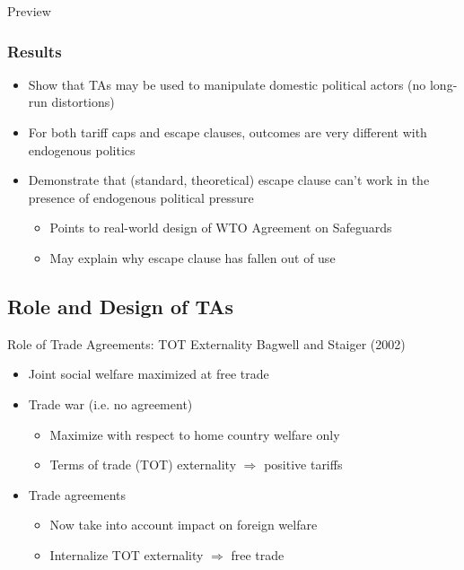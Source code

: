 \documentclass[handout]{beamer}
\begin{document}
\begin{frame}{Preview}
\frametitle{Results}

\pause
\begin{itemize}[<+->]
	\item Show that TAs may be used to manipulate domestic political actors (no long-run distortions)
	\item For both tariff caps and escape clauses, outcomes are very different with endogenous politics
	\item Demonstrate that (standard, theoretical) escape clause can't work in the presence of endogenous political pressure
		\begin{itemize}
			\item Points to real-world design of WTO Agreement on Safeguards
			\item May explain why escape clause has fallen out of use
		\end{itemize}
\end{itemize}
\end{frame}

\begin{comment}
\begin{frame}{Outline of Talk}
\pause
\begin{enumerate}[<+->]
	\item Model
	\item Government Objective Function
	\item Base Model with Tariff Caps
	\item Escape Clause
	\item Conclusion
\end{enumerate}
\end{frame}
\end{comment}

\subsection{Role and Design of TAs}
\begin{frame}{Role of Trade Agreements: TOT Externality}
\pause
Bagwell and Staiger (2002)
\pause
\begin{itemize}[<+->]
	\item Joint social welfare maximized at free trade
	\item Trade war (i.e. no agreement)
		\begin{itemize}
			\item Maximize with respect to home country welfare only
			\item Terms of trade (TOT) externality $\Rightarrow$ positive tariffs  
		\end{itemize}
	\item Trade agreements
    \begin{itemize}
			\item Now take into account impact on foreign welfare
			\item Internalize TOT externality $\Rightarrow$ free trade
    \end{itemize}
\end{itemize}
\end{frame} 
\end{document}
